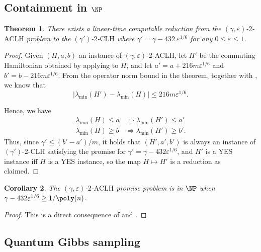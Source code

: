 \documentclass[a4paper,onecolumn,11pt]{quantumarticle}
\theoremstyle{plain}
\newtheorem{theorem}{Theorem}[section]
\newtheorem{corollary}[theorem]{Corollary}
\newcommand{\eps}{\varepsilon}
\begin{document}
\subsection{Containment in $\NP$}
\begin{theorem}\label{thm:aclh-to-clh-reduction}
There exists a linear-time computable reduction from the $(\gamma, \eps)$-$2$-$\mathrm{ACLH}$ problem to the $(\gamma')$-$2$-$\mathrm{CLH}$ where $\gamma' = \gamma - 432\ \eps^{1/6}$ for any $0 \leq \eps \leq 1$.
\end{theorem}
\begin{proof}
Given $(H,a,b)$ an instance of $(\gamma,\eps)$-2-ACLH, let $H'$ be the commuting Hamiltonian obtained by applying  to $H$, and let $a' = a + 216m\eps^{1/6}$ and $b' = b - 216m\eps^{1/6}$. From the operator norm bound in the theorem, together with , we know that \[|\lambda_{\min}(H') - \lambda_{\min}(H)| \leq 216 m \eps^{1/6}. \] 

Hence, we have
\begin{align}
    \lambda_{\min}(H) \leq a &\Longrightarrow \lambda_{\min}(H') \leq a' \\
    \lambda_{\min}(H) \geq b &\Longrightarrow \lambda_{\min}(H') \geq b'.
\end{align}
Thus, since $\gamma' \leq (b'-a')/m$, it holds that $(H',a',b')$ is always an instance of $(\gamma')$-2-CLH satisfying the promise for $\gamma' = \gamma - 432\eps^{1/6}$, and $H'$ is a YES instance iff $H$ is a YES instance, so the map $H \mapsto H'$ is a reduction as claimed.
\end{proof}


\begin{corollary}
\label{corollary:NP-Containment}
    The $(\gamma, \eps)$-$2$-$\mathrm{ACLH}$ promise problem is in $\NP$ when $\gamma - 432\eps^{1/6} \geq 1/\poly(n)$.
\end{corollary}
\begin{proof}
This is a direct consequence of  and .
\end{proof}


\subsection{Quantum Gibbs sampling}\label{sec:Gibbs}
\end{document}
